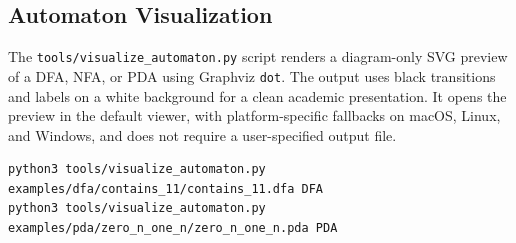 \documentclass{article}
\begin{document}
\subsection{Automaton Visualization}
The \texttt{tools/visualize\_automaton.py} script renders a diagram-only SVG preview of a DFA, NFA, or PDA using Graphviz \texttt{dot}. The output uses black transitions and labels on a white background for a clean academic presentation. It opens the preview in the default viewer, with platform-specific fallbacks on macOS, Linux, and Windows, and does not require a user-specified output file.
\begin{lstlisting}
python3 tools/visualize_automaton.py examples/dfa/contains_11/contains_11.dfa DFA
python3 tools/visualize_automaton.py examples/pda/zero_n_one_n/zero_n_one_n.pda PDA
\end{lstlisting}
\end{document}
